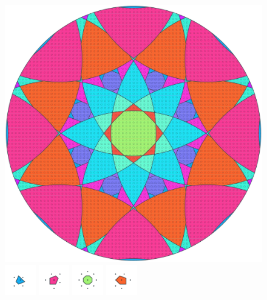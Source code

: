 \documentclass[text.tex]{subfiles}
\begin{document}
\clearpage
\pagestyle{fancy}
\fancyhf{}
\begin{figure}[h!]
\centering
\includegraphics[width=1\textwidth]{img/results/circle8/circle8_121607_(4546_-1881alpha_4).pdf}
\includegraphics[width=0.12\textwidth]{img/results/circle8/circle8_121607_(4546_-1881alpha_4)_001.pdf}
\includegraphics[width=0.12\textwidth]{img/results/circle8/circle8_121607_(4546_-1881alpha_4)_002.pdf}
\includegraphics[width=0.12\textwidth]{img/results/circle8/circle8_121607_(4546_-1881alpha_4)_003.pdf}
\includegraphics[width=0.12\textwidth]{img/results/circle8/circle8_121607_(4546_-1881alpha_4)_004.pdf}

\end{figure}
\end{document}
